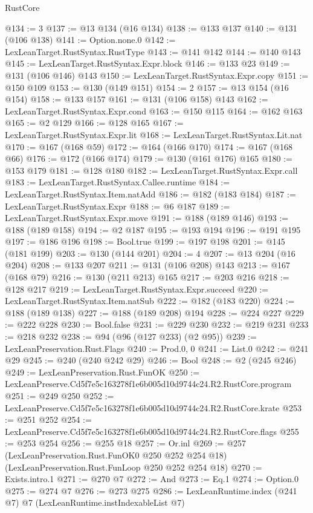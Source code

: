 \begin{lexlean}{RustCore}
\begin{coremodule}
@134 := 3
@137 := @13 @134 (@16 @134)
@138 := @133 @137
@140 := @131 (@106 @138)
@141 := Option.none.{0}
@142 := LexLeanTarget.RustSyntax.RustType
@143 := @141 @142
@144 := @140 @143
@145 := LexLeanTarget.RustSyntax.Expr.block
@146 := @133 @23
@149 := @131 (@106 @146) @143
@150 := LexLeanTarget.RustSyntax.Expr.copy
@151 := @150 @109
@153 := @130 (@149 @151)
@154 := 2
@157 := @13 @154 (@16 @154)
@158 := @133 @157
@161 := @131 (@106 @158) @143
@162 := LexLeanTarget.RustSyntax.Expr.cond
@163 := @150 @115
@164 := @162 @163
@165 := @2 @129
@166 := @128 @165
@167 := LexLeanTarget.RustSyntax.Expr.lit
@168 := LexLeanTarget.RustSyntax.Lit.nat
@170 := @167 (@168 @59)
@172 := @164 (@166 @170)
@174 := @167 (@168 @66)
@176 := @172 (@166 @174)
@179 := @130 (@161 @176) @165
@180 := @153 @179
@181 := @128 @180
@182 := LexLeanTarget.RustSyntax.Expr.call
@183 := LexLeanTarget.RustSyntax.Callee.runtime
@184 := LexLeanTarget.RustSyntax.Item.natAdd
@186 := @182 (@183 @184)
@187 := LexLeanTarget.RustSyntax.Expr
@188 := @6 @187
@189 := LexLeanTarget.RustSyntax.Expr.move
@191 := @188 (@189 @146)
@193 := @188 (@189 @158)
@194 := @2 @187
@195 := @193 @194
@196 := @191 @195
@197 := @186 @196
@198 := Bool.true
@199 := @197 @198
@201 := @145 (@181 @199)
@203 := @130 (@144 @201)
@204 := 4
@207 := @13 @204 (@16 @204)
@208 := @133 @207
@211 := @131 (@106 @208) @143
@213 := @167 (@168 @79)
@216 := @130 (@211 @213) @165
@217 := @203 @216
@218 := @128 @217
@219 := LexLeanTarget.RustSyntax.Expr.succeed
@220 := LexLeanTarget.RustSyntax.Item.natSub
@222 := @182 (@183 @220)
@224 := @188 (@189 @138)
@227 := @188 (@189 @208) @194
@228 := @224 @227
@229 := @222 @228
@230 := Bool.false
@231 := @229 @230
@232 := @219 @231
@233 := @218 @232
@238 := @94 (@96 (@127 @233) (@2 @95))
@239 := LexLeanPreservation.Rust.Flags
@240 := Prod.{0, 0}
@241 := List.{0}
@242 := @241 @29
@245 := @240 (@240 @242 @29)
@246 := Bool
@248 := @2 (@245 @246)
@249 := LexLeanPreservation.Rust.FunOK
@250 := LexLeanPreserve.Cd5f7e5c163278f1e6b005d10d9744c24.R2.RustCore.program
@251 := @249 @250
@252 := LexLeanPreserve.Cd5f7e5c163278f1e6b005d10d9744c24.R2.RustCore.krate
@253 := @251 @252
@254 := LexLeanPreserve.Cd5f7e5c163278f1e6b005d10d9744c24.R2.RustCore.flags
@255 := @253 @254
@256 := @255 @18
@257 := Or.inl
@269 := @257
    (LexLeanPreservation.Rust.FunOK0 @250 @252 @254 @18)
    (LexLeanPreservation.Rust.FunLoop @250 @252 @254 @18)
@270 := Exists.intro.{1}
@271 := @270 @7
@272 := And
@273 := Eq.{1}
@274 := Option.{0}
@275 := @274 @7
@276 := @273 @275
@286 := LexLeanRuntime.index
    (@241 @7)
    @7
    (LexLeanRuntime.instIndexableList @7)

\end{coremodule}
\end{lexlean}
